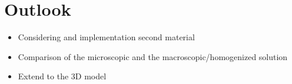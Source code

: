 \documentclass[10pt]{beamer}	%
\begin{document}
	\section{Outlook}
	\begin{frame}
	\begin{itemize}
		\item Considering and implementation second material
		\item Comparison of the microscopic and the macroscopic/homogenized solution
		\item Extend to the 3D model
	\end{itemize}
	\end{frame}

% 
% 
% 		
% 	
% 	
% 	
% 	
% 	
% 	
% 
% 
\end{document}
